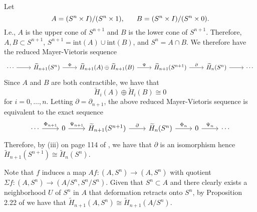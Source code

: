 \documentclass[twoside, titlepage]{amsart}
\makeatletter
\theoremstyle{plain} %
\theoremstyle{definition}
\theoremstyle{remark}
\theoremstyle{notation}
\renewenvironment{proof}[1][\proofname]{\par
	\pushQED{\qed}%
	\normalfont \topsep6\p@\@plus6\p@\relax
	\trivlist
	\item\relax
	{\itshape
		#1\@addpunct{.}}\hspace\labelsep\ignorespaces
}{%
\popQED\endtrivlist\@endpefalse
}
\newcommand{\redhom}[1]{\widetilde{#1}}
\newcommand{\interior}[1]{\text{int}(#1)}
\makeatother
\begin{document}
	\begin{proof}
		
		Let
		$$A = (S^n \times I) / (S^n \times 1), \hspace{6mm} B = (S^n \times I) / (S^n \times 0).$$
		I.e., $A$ is the upper cone of $S^{n+1}$ and $B$ is the lower cone of $S^{n+1}$.  Therefore, $A, B \subset S^{n+1}$, $S^{n+1} = \interior{A} \cup \interior{B}$, and $S^n = A \cap B$.  We therefore have the reduced Mayer-Vietoris sequence
		$$\begin{tikzcd}
		\cdots \arrow[r] & \redhom{H}_{n+1}(S^n) \arrow[r, "\Phi"] & \redhom{H}_{n+1}(A) \oplus \redhom{H}_{n+1}(B) \arrow[r, "\Psi"] & \redhom{H}_{n+1}(S^{n+1}) \arrow[r, "\partial"] & \redhom{H}_n(S^n) \arrow[r] & \cdots
		\end{tikzcd}$$
		Since $A$ and $B$ are both contractible, we have that
		$$\redhom{H}_i(A) \oplus \redhom{H}_i(B) \cong 0$$
		for $i = 0, \dots, n$.  Letting $\partial = \partial_{n+1}$, the above reduced Mayer-Vietoris sequence is equivalent to the exact sequence
		$$\begin{tikzcd}
		\cdots \arrow[r, "\Phi_{n+1}"] & 0 \arrow[r, "\Psi_{n+1}"] & \redhom{H}_{n+1}(S^{n+1}) \arrow[r, "\partial"] & \redhom{H}_n(S^n) \arrow[r, "\Phi_n"] & 0 \arrow[r, "\Psi_n"] & \cdots
		\end{tikzcd}$$
		Therefore, by (iii) on page 114 of \cite{hatcher01}, we have that $\partial$ is an isomorphism hence $\redhom{H}_{n+1}(S^{n+1}) \cong \redhom{H}_n(S^n)$.
		
		Note that $f$ induces a map $Af: (A, S^n) \to (A, S^n)$ with quotient $\Sigma f: (A, S^n) \to (A/S^n,S^n/S^n)$.  Given that $S^n \subset A$ and there clearly exists a neighborhood $U$ of $S^n$ in $A$ that deformation retracts onto $S^n$, by Proposition 2.22 of \cite{hatcher01} we have that $\redhom{H}_{n+1}(A, S^n) \cong \redhom{H}_{n+1}(A / S^n)$.
		

\end{proof}
\end{document}
